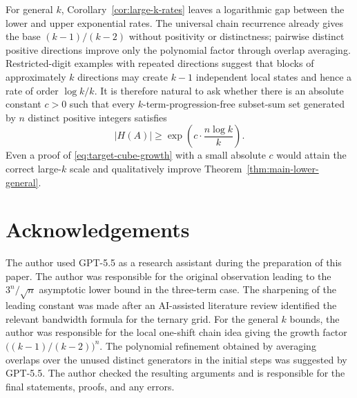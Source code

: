 \documentclass[11pt]{article}
\numberwithin{equation}{section}
\theoremstyle{definition}
\theoremstyle{remark}
\begin{document}
\bigskip
\noindent
For general $k$, Corollary~\ref{cor:large-k-rates} leaves a logarithmic gap between the lower and upper exponential rates. The universal chain recurrence already gives the base $(k-1)/(k-2)$ without positivity or distinctness; pairwise distinct positive directions improve only the polynomial factor through overlap averaging. Restricted-digit examples with repeated directions suggest that blocks of approximately $k$ directions may create $k-1$ independent local states and hence a rate of order $\log k/k$. It is therefore natural to ask whether there is an absolute constant $c>0$ such that every $k$-term-progression-free subset-sum set generated by $n$ distinct positive integers satisfies
\begin{equation}\label{eq:target-cube-growth}
|H(A)|\ge\exp\!\left(c\cdot\frac{n\log k}{k}\right).
\end{equation}
Even a proof of \eqref{eq:target-cube-growth} with a small absolute $c$ would attain the correct large-$k$ scale and qualitatively improve Theorem~\ref{thm:main-lower-general}.

\section*{Acknowledgements}
The author used  GPT-5.5 as a research assistant during the preparation of this paper. The author was responsible for the original observation leading to the $3^n/\sqrt n$ asymptotic lower bound in the three-term case. The sharpening of the leading constant was made after an AI-assisted literature review identified the relevant bandwidth formula for the ternary grid. For the general $k$ bounds, the author was responsible for the local one-shift chain idea giving the growth factor $\bigl((k-1)/(k-2)\bigr)^n$. The polynomial refinement obtained by averaging overlaps over the unused distinct generators in the initial steps was suggested by GPT-5.5. The author checked the resulting arguments and is responsible for the final statements, proofs, and any errors.
\end{document}
